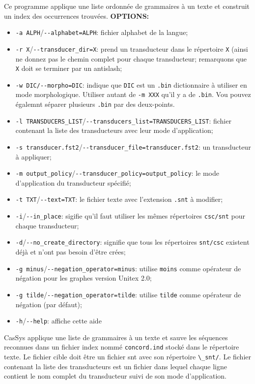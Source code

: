 \bigskip
\noindent Ce programme applique une liste ordonnée de grammaires à un texte et construit un index
des occurrences trouvées.
\bigskip
\noindent \textbf{OPTIONS:}
\begin{itemize}
\item \verb+-a ALPH+/\verb+--alphabet=ALPH+: fichier alphabet de la langue;
\item \verb+-r X+/\verb+--transducer_dir=X+: prend un transducteur dans le répertoire \verb+X+ (ainsi ne
		donnez pas le chemin complet pour chaque transducteur; remarquons que \verb+X+ doit se
		terminer par un antislash;
	\item \verb+-w DIC/--morpho=DIC+: indique que \verb+DIC+ est un \verb+.bin+ dictionnaire à utiliser en mode morphologique.
		Utiliser autant de  \verb+-m XXX+ qu'il y a de \verb+.bin+. Vou pouvez égalemnt séparer plusieurs \verb+.bin+ par des deux-points.

\item \verb+-l TRANSDUCERS_LIST+/\verb+--transducers_list=TRANSDUCERS_LIST+: fichier
		contenant la liste des transducteurs avec leur mode d'application;
\item \verb+-s transducer.fst2+/\verb+--transducer_file=transducer.fst2+: un transducteur à
		appliquer;
\item \verb+-m output_policy+/\verb+--transducer_policy=output_policy+: le mode
		d'application du transducteur spécifié;
\item \verb+-t TXT+/\verb+--text=TXT+: le fichier texte avec l'extension \verb+.snt+ à modifier;
\item \verb+-i+/\verb+--in_place+: sigifie qu'il faut utiliser les mêmes répertoires \verb+csc/snt+
	pour chaque transducteur;
\item \verb+-d+/\verb+--no_create_directory+: signifie que tous les répertoires \verb+snt/csc+
	existent déjà et n'ont pas besoin d'être crées;
\item \verb+-g minus+/\verb+--negation_operator=minus+: utilise \verb+moins+ comme opérateur de
	négation pour les graphes version Unitex 2.0;
\item \verb+-g tilde+/\verb+--negation_operator=tilde+: utilise \verb+tilde+ comme opérateur de
	négation (par défaut);
\item \verb+-h+/\verb+--help+: affiche cette aide
\end{itemize} 	


\bigskip
\noindent CasSys applique une liste de grammaires à un texte et sauve les séquences reconnues dans
un fichier index nommé \verb+concord.ind+ stocké dans le répertoire texte.
Le fichier cible doit être un fichier snt avec son répertoire \verb+\_snt/+. 
Le fichier contenant la liste des transducteurs est un fichier dans lequel chaque ligne contient le
nom complet du transducteur suivi de son mode d'application.

